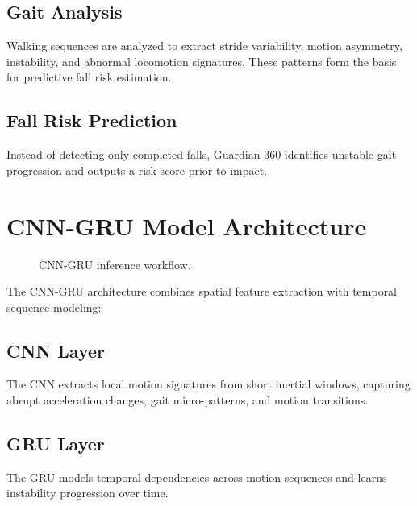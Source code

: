 \documentclass[conference]{IEEEtran}
\begin{document}
\subsection{Gait Analysis}
Walking sequences are analyzed to extract stride variability, motion asymmetry, instability, and abnormal locomotion signatures. These patterns form the basis for predictive fall risk estimation.

\subsection{Fall Risk Prediction}
Instead of detecting only completed falls, Guardian 360 identifies unstable gait progression and outputs a risk score prior to impact.

\section{CNN-GRU Model Architecture}
\begin{figure}[!t]
\centering
{}
\caption{CNN-GRU inference workflow.}
\label{fig:cnngru}
\end{figure}

The CNN-GRU architecture combines spatial feature extraction with temporal sequence modeling:

\subsection{CNN Layer}
The CNN extracts local motion signatures from short inertial windows, capturing abrupt acceleration changes, gait micro-patterns, and motion transitions.

\subsection{GRU Layer}
The GRU models temporal dependencies across motion sequences and learns instability progression over time.
\end{document}
